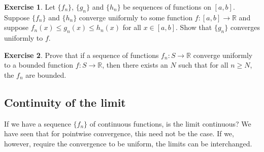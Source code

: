 \documentclass[12pt,openany]{book}
\newcommand{\R}{{\mathbb{R}}}
\theoremstyle{plain}
\theoremstyle{remark}
\theoremstyle{definition}
\newenvironment{exbox}{%
    \def\FrameCommand{\vrule width 1pt \relax\hspace{10pt}}%
    \MakeFramed{\advance\hsize-\width\FrameRestore}%
}{%
    \endMakeFramed
}
\newenvironment{exparts}{%
    \leavevmode\begin{enumerate}[a),noitemsep,topsep=0pt,parsep=0pt,partopsep=0pt]
}{%
    \end{enumerate}
}
\theoremstyle{exercise}
\newtheorem{exercise}{Exercise}[section]
\theoremstyle{example}
\newcommand{\exampleref}[1]{\hyperref[#1]{Example~\ref*{#1}}}
\begin{document}
\begin{exbox}
\begin{exercise}
Let $\{ f_n \}$, $\{ g_n \}$ and $\{ h_n \}$ be sequences of functions on
$[a,b]$.  Suppose $\{ f_n \}$ and $\{ h_n \}$ converge uniformly to some function
$f \colon [a,b] \to \R$ and suppose $f_n(x) \leq g_n(x) \leq h_n(x)$
for all $x \in [a,b]$.  Show that $\{ g_n \}$ converges uniformly to $f$.
\end{exercise}



\begin{exercise}
Prove that
if a sequence of functions $f_n \colon S \to \R$
converge uniformly to a bounded function $f \colon S \to \R$,
then there exists an $N$ such that for all $n \geq N$, the $f_n$
are bounded.
\end{exercise}

\end{exbox}

\subsection{Continuity of the limit}

If we have a sequence $\{ f_n \}$ of continuous functions,
is the limit continuous?  We have seen that for pointwise
convergence, this need not be the case.
If we, however, require the convergence to be uniform, the limits can
be interchanged.
\end{document}
